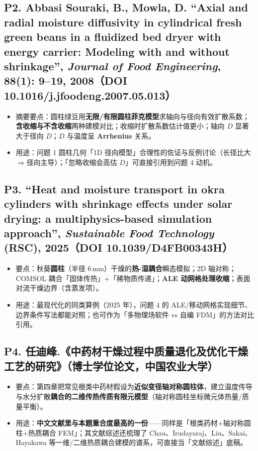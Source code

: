 \documentclass[12pt,a4paper]{ctexart}
\begin{document}
\subsection{P2. Abbasi Souraki, B., Mowla, D. ``Axial and radial moisture diffusivity in cylindrical fresh green beans in a fluidized bed dryer with energy carrier: Modeling with and without shrinkage'', \textit{Journal of Food Engineering}, 88(1): 9--19, 2008（DOI 10.1016/j.jfoodeng.2007.05.013）\quad [摘要已核]}
\begin{itemize}
\item 摘要要点：圆柱绿豆用\textbf{无限/有限圆柱菲克模型}求轴向与径向有效扩散系数；\textbf{含收缩与不含收缩}两种建模对比；收缩时扩散系数估计值更小；轴向 $D$ 显著大于径向 $D$；$D$ 与温度呈 \textbf{Arrhenius} 关系。
\item 用途：问题 1 圆柱几何「1D 径向模型」合理性的佐证与反例讨论（长径比大$\Rightarrow$径向主导）；「忽略收缩会高估 $D$」可直接引用到问题 4 动机。
\end{itemize}

\subsection{P3. ``Heat and moisture transport in okra cylinders with shrinkage effects under solar drying: a multiphysics-based simulation approach'', \textit{Sustainable Food Technology} (RSC), 2025（DOI 10.1039/D4FB00343H）\quad [摘要已核]}
\begin{itemize}
\item 要点：秋葵\textbf{圆柱}（半径 6\,mm）干燥的\textbf{热-湿耦合}瞬态模拟；2D 轴对称；COMSOL 耦合「固体传热」$+$「稀物质传递」；\textbf{ALE 动网格处理收缩}；表面对流干燥边界（含蒸发项）。
\item 用途：最现代化的同类算例（2025 年），问题 4 的 ALE/移动网格实现细节、边界条件写法都能对照；也可作为「多物理场软件 vs 自编 FDM」的方法对比引用。
\end{itemize}

\subsection{P4. 任迪峰.《中药材干燥过程中质量退化及优化干燥工艺的研究》（博士学位论文，中国农业大学）}
\begin{itemize}
\item 要点：第四章把常见根类中药材假设为\textbf{近似变径轴对称圆柱体}，建立温度传导与水分扩散\textbf{耦合的二维传热传质有限元模型}（轴对称圆柱坐标微元体热量/质量平衡）。
\item 用途：\textbf{中文文献里与本题重合度最高的一份}——同样是「根类药材$+$轴对称圆柱$+$热质耦合 FEM」；其文献综述还梳理了 Chau、Irudayaraj、Liu、Sakai、Hayakawa 等一维/二维热质耦合建模的谱系，可直接当「文献综述」底稿。
\end{itemize}
\end{document}
